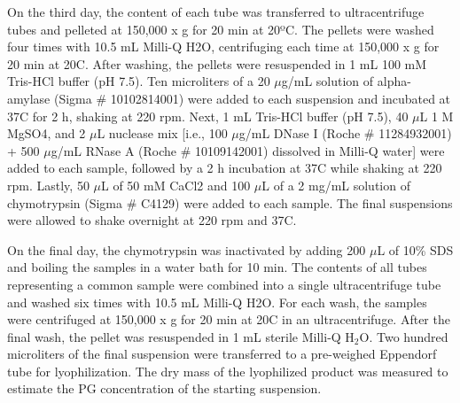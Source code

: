 \documentclass[twoside, watermark]{zHenriquesLab-StyleBioRxiv}
\newcommand{\HtwoO}{H$_\text{2}$O} %
\newcommand{\tmu}{$\mu$} %
\begin{document}
\vspace{1mm}
On the third day, the content of each tube was transferred to ultracentrifuge tubes and pelleted at 150,000 x g for 20 min at 20ºC. The pellets were washed four times with 10.5 mL Milli-Q H2O, centrifuging each time at 150,000 x g for 20 min at 20\degree C. After washing, the pellets were resuspended in 1 mL 100 mM Tris-HCl buffer (pH 7.5). Ten microliters of a 20 \tmu g/mL solution of alpha-amylase (Sigma \# 10102814001) were added to each suspension and incubated at 37\degree C for 2 h, shaking at 220 rpm. Next, 1 mL Tris-HCl buffer (pH 7.5), 40 \tmu L 1 M MgSO4, and 2 \tmu L nuclease mix [i.e., 100 \tmu g/mL DNase I (Roche \# 11284932001) + 500 \tmu g/mL RNase A (Roche \# 10109142001) dissolved in Milli-Q water] were added to each sample, followed by a 2 h incubation at 37\degree C while shaking at 220 rpm. Lastly, 50 \tmu L of 50 mM CaCl2 and 100 \tmu L of a 2 mg/mL solution of chymotrypsin (Sigma \# C4129) were added to each sample. The final suspensions were allowed to shake overnight at 220 rpm and 37\degree C. 

\vspace{1mm}
On the final day, the chymotrypsin was inactivated by adding 200 \tmu L of 10\% SDS and boiling the samples in a water bath for 10 min. The contents of all tubes representing a common sample were combined into a single ultracentrifuge tube and washed six times with 10.5 mL Milli-Q H2O. For each wash, the samples were centrifuged at 150,000 x g for 20 min at 20\degree C in an ultracentrifuge. After the final wash, the pellet was resuspended in 1 mL sterile Milli-Q \HtwoO. Two hundred microliters of the final suspension were transferred to a pre-weighed Eppendorf tube for lyophilization. The dry mass of the lyophilized product was measured to estimate the PG concentration of the starting suspension.
\end{document}
